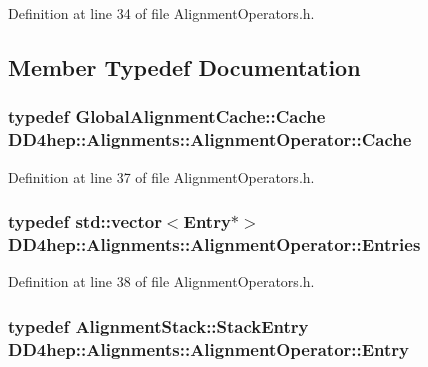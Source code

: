 Definition at line 34 of file AlignmentOperators.h.

\subsection{Member Typedef Documentation}
\hypertarget{class_d_d4hep_1_1_alignments_1_1_alignment_operator_aa2e6502de3afb25286845cae785ab1d7}{
\subsubsection[{Cache}]{\setlength{\rightskip}{0pt plus 5cm}typedef {\bf GlobalAlignmentCache::Cache} {\bf DD4hep::Alignments::AlignmentOperator::Cache}}}
\label{class_d_d4hep_1_1_alignments_1_1_alignment_operator_aa2e6502de3afb25286845cae785ab1d7}


Definition at line 37 of file AlignmentOperators.h.\hypertarget{class_d_d4hep_1_1_alignments_1_1_alignment_operator_ada83b10531c5774c75f6e8c224f55f4c}{
\subsubsection[{Entries}]{\setlength{\rightskip}{0pt plus 5cm}typedef std::vector$<${\bf Entry}$\ast$$>$ {\bf DD4hep::Alignments::AlignmentOperator::Entries}}}
\label{class_d_d4hep_1_1_alignments_1_1_alignment_operator_ada83b10531c5774c75f6e8c224f55f4c}


Definition at line 38 of file AlignmentOperators.h.\hypertarget{class_d_d4hep_1_1_alignments_1_1_alignment_operator_a0dc91b46151c3685f152574147339899}{
\subsubsection[{Entry}]{\setlength{\rightskip}{0pt plus 5cm}typedef {\bf AlignmentStack::StackEntry} {\bf DD4hep::Alignments::AlignmentOperator::Entry}}}
\label{class_d_d4hep_1_1_alignments_1_1_alignment_operator_a0dc91b46151c3685f152574147339899}


